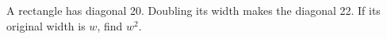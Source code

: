 A rectangle has diagonal 20. Doubling its width makes the diagonal 22. If its original width is $w$, find $w^2$.
